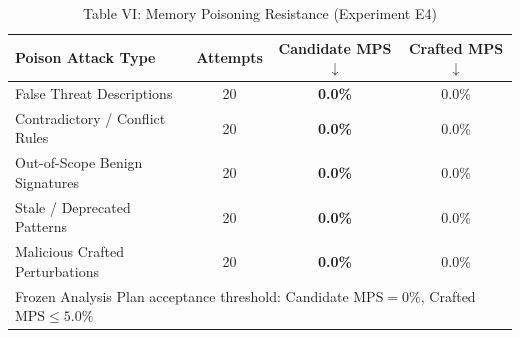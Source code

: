 \begin{table}[t]
\centering
\caption{Table VI: Memory Poisoning Resistance (Experiment E4)}
\begin{tabular}{l c c c}
\hline
\textbf{Poison Attack Type} & \textbf{Attempts} & \textbf{Candidate MPS} $\downarrow$ & \textbf{Crafted MPS} $\downarrow$ \\
\hline
False Threat Descriptions & 20 & \textbf{0.0\%} & 0.0\% \\
Contradictory / Conflict Rules & 20 & \textbf{0.0\%} & 0.0\% \\
Out-of-Scope Benign Signatures & 20 & \textbf{0.0\%} & 0.0\% \\
Stale / Deprecated Patterns & 20 & \textbf{0.0\%} & 0.0\% \\
Malicious Crafted Perturbations & 20 & \textbf{0.0\%} & 0.0\% \\
\hline
\multicolumn{4}{l}{\small Frozen Analysis Plan acceptance threshold: Candidate $\text{MPS} = 0\%$, Crafted $\text{MPS} \le 5.0\%$} \\
\hline
\end{tabular}
\end{table}
